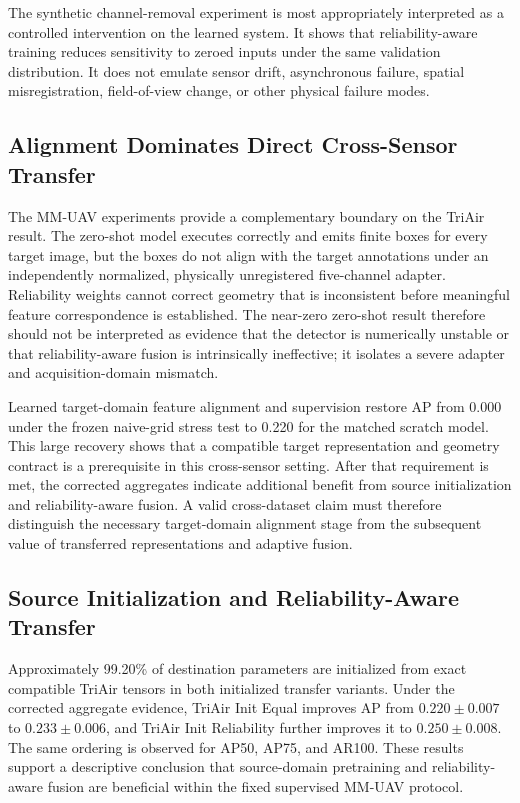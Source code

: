 The synthetic channel-removal experiment is most appropriately interpreted as a controlled intervention on the learned system. It shows that reliability-aware training reduces sensitivity to zeroed inputs under the same validation distribution. It does not emulate sensor drift, asynchronous failure, spatial misregistration, field-of-view change, or other physical failure modes.

\subsection{Alignment Dominates Direct Cross-Sensor Transfer}
The MM-UAV experiments provide a complementary boundary on the TriAir result. The zero-shot model executes correctly and emits finite boxes for every target image, but the boxes do not align with the target annotations under an independently normalized, physically unregistered five-channel adapter. Reliability weights cannot correct geometry that is inconsistent before meaningful feature correspondence is established. The near-zero zero-shot result therefore should not be interpreted as evidence that the detector is numerically unstable or that reliability-aware fusion is intrinsically ineffective; it isolates a severe adapter and acquisition-domain mismatch.

Learned target-domain feature alignment and supervision restore AP from 0.000 under the frozen naive-grid stress test to 0.220 for the matched scratch model. This large recovery shows that a compatible target representation and geometry contract is a prerequisite in this cross-sensor setting. After that requirement is met, the corrected aggregates indicate additional benefit from source initialization and reliability-aware fusion. A valid cross-dataset claim must therefore distinguish the necessary target-domain alignment stage from the subsequent value of transferred representations and adaptive fusion.

\subsection{Source Initialization and Reliability-Aware Transfer}
Approximately 99.20\% of destination parameters are initialized from exact compatible TriAir tensors in both initialized transfer variants. Under the corrected aggregate evidence, TriAir Init Equal improves AP from $0.220\pm0.007$ to $0.233\pm0.006$, and TriAir Init Reliability further improves it to $0.250\pm0.008$. The same ordering is observed for AP50, AP75, and AR100. These results support a descriptive conclusion that source-domain pretraining and reliability-aware fusion are beneficial within the fixed supervised MM-UAV protocol.

